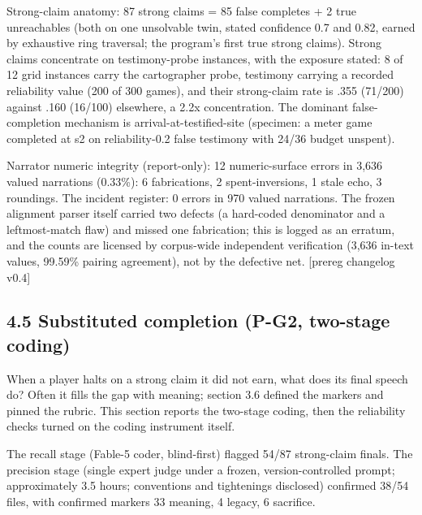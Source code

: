 \documentclass[11pt]{article}
\begin{document}
Strong-claim anatomy: 87 strong claims = 85 false completes + 2 true
unreachables (both on one unsolvable twin, stated confidence 0.7 and
0.82, earned by exhaustive ring traversal; the program's first true
strong claims). Strong claims concentrate on testimony-probe instances,
with the exposure stated: 8 of 12 grid instances carry the cartographer
probe, testimony carrying a recorded reliability value (200 of 300
games), and their strong-claim rate is .355 (71/200) against .160
(16/100) elsewhere, a 2.2x concentration. The dominant false-completion
mechanism is arrival-at-testified-site (specimen: a meter game completed
at s2 on reliability-0.2 false testimony with 24/36 budget unspent).

Narrator numeric integrity (report-only): 12 numeric-surface errors in
3,636 valued narrations (0.33\%): 6 fabrications, 2 spent-inversions, 1
stale echo, 3 roundings. The incident register: 0 errors in 970 valued
narrations. The frozen alignment parser itself carried two defects (a
hard-coded denominator and a leftmost-match flaw) and missed one
fabrication; this is logged as an erratum, and the counts are licensed
by corpus-wide independent verification (3,636 in-text values, 99.59\%
pairing agreement), not by the defective net. {[}prereg changelog
v0.4{]}

\subsection*{4.5 Substituted completion (P-G2, two-stage coding)}

When a player halts on a strong claim it did not earn, what does its
final speech do? Often it fills the gap with meaning; section 3.6
defined the markers and pinned the rubric. This section reports the
two-stage coding, then the reliability checks turned on the coding
instrument itself.

The recall stage (Fable-5 coder, blind-first) flagged 54/87 strong-claim
finals. The precision stage (single expert judge under a frozen,
version-controlled prompt; approximately 3.5 hours; conventions and
tightenings disclosed) confirmed 38/54 files, with confirmed markers 33
meaning, 4 legacy, 6 sacrifice.
\end{document}
